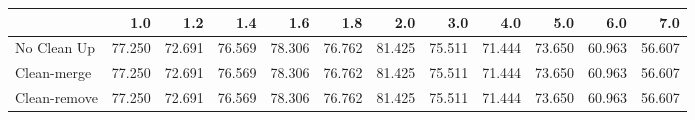 \begin{tabular}{lrrrrrrrrrrr}
\toprule
{} &    1.0 &    1.2 &    1.4 &    1.6 &    1.8 &    2.0 &    3.0 &    4.0 &    5.0 &    6.0 &    7.0 \\
\midrule
No Clean Up  & 77.250 & 72.691 & 76.569 & 78.306 & 76.762 & 81.425 & 75.511 & 71.444 & 73.650 & 60.963 & 56.607 \\
Clean-merge  & 77.250 & 72.691 & 76.569 & 78.306 & 76.762 & 81.425 & 75.511 & 71.444 & 73.650 & 60.963 & 56.607 \\
Clean-remove & 77.250 & 72.691 & 76.569 & 78.306 & 76.762 & 81.425 & 75.511 & 71.444 & 73.650 & 60.963 & 56.607 \\
\bottomrule
\end{tabular}
